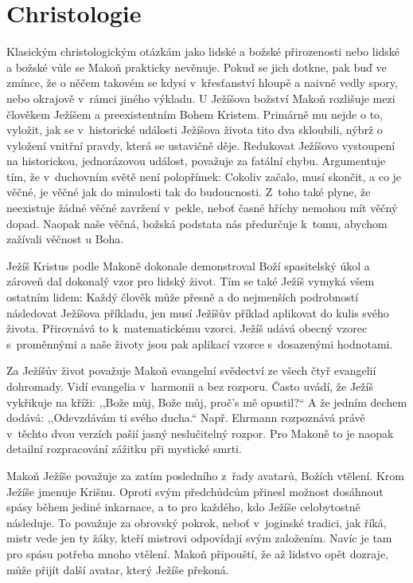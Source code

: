 \section{Christologie}

Klasickým christologickým otázkám jako lidské a božské přirozenosti nebo lidské
a božské vůle se Makoň prakticky nevěnuje. Pokud se jich dotkne, pak buď ve
zmínce, že o něčem takovém se kdysi v~křesťanství hloupě a naivně vedly spory,
nebo okrajově v~rámci jiného výkladu. U Ježíšova božství Makoň rozlišuje mezi
člověkem Ježíšem a preexistentním Bohem Kristem. Primárně mu nejde o to,
vyložit, jak se v~historické události Ježíšova života tito dva skloubili, nýbrž
o vyložení vnitřní pravdy, která se ustavičně děje. Redukovat Ježíšovo
vystoupení na historickou, jednorázovou událost, považuje za fatální chybu.
Argumentuje tím, že v~duchovním světě není polopřímek: Cokoliv začalo, musí
skončit, a co je věčné, je věčné jak do minulosti tak do budoucnosti. Z~toho
také plyne, že neexistuje žádné věčné zavržení v~pekle, neboť časné hříchy
nemohou mít věčný dopad. Naopak naše věčná, božská podstata nás předurčuje
k~tomu, abychom zažívali věčnost u Boha.

Ježíš Kristus podle Makoně dokonale demonstroval Boží spasitelský úkol a zároveň
dal dokonalý vzor pro lidský život. Tím se také Ježíš vymyká všem ostatním
lidem: Každý člověk může přesně a do nejmenších podrobností následovat Ježíšova
příkladu, jen musí Ježíšův příklad aplikovat do kulis svého života. Přirovnává
to k~matematickému vzorci. Ježíš udává obecný vzorec s~proměnnými a naše životy
jsou pak aplikací vzorce s~dosazenými hodnotami.

Za Ježíšův život považuje Makoň evangelní svědectví ze všech čtyř evangelií
dohromady. Vidí evangelia v~harmonii a bez rozporu. Často uvádí, že Ježíš
vykřikuje na kříži: ,,Bože můj, Bože můj, proč's mě opustil?`` A že jedním
dechem dodává: ,,Odevzdávám ti svého ducha.`` Např. Ehrmann rozpoznává právě
v~těchto dvou verzích pašií jasný neslučitelný rozpor\cite{ehrman2000new}. Pro
Makoně to je naopak detailní rozpracování zážitku při mystické smrti.

Makoň Ježíše považuje za zatím posledního z~řady avatarů, Božích vtělení. Krom
Ježíše jmenuje Krišnu. Oproti svým předchůdcům přinesl možnost dosáhnout spásy
během jediné inkarnace, a to pro každého, kdo Ježíše celobytostně následuje. To
považuje za obrovský pokrok, neboť v~joginské tradici, jak říká, mistr vede jen
ty žáky, kteří mistrovi odpovídají svým založením. Navíc je tam pro spásu
potřeba mnoho vtělení. Makoň připouští, že až lidstvo opět dozraje, může přijít
další avatar, který Ježíše překoná.

